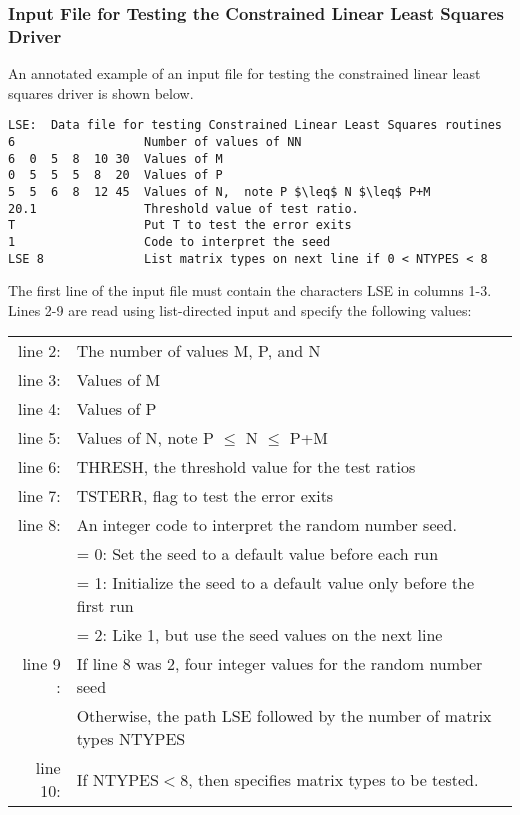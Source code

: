 \subsubsection{Input File for Testing the Constrained Linear Least
Squares Driver}

\dent
An annotated example of an input file for testing the constrained
linear least squares driver is shown below.
\begin{verbatim}
LSE:  Data file for testing Constrained Linear Least Squares routines
6                  Number of values of NN  
6  0  5  8  10 30  Values of M 
0  5  5  5  8  20  Values of P         
5  5  6  8  12 45  Values of N,  note P $\leq$ N $\leq$ P+M
20.1               Threshold value of test ratio.
T                  Put T to test the error exits
1                  Code to interpret the seed
LSE 8              List matrix types on next line if 0 < NTYPES < 8
\end{verbatim}

The first line of the input file must contain the characters LSE
in columns 1-3.  Lines 2-9 are read using list-directed input and
specify the following values:

\begin{tabular}{r l}
\\
line 2: &  The number of values M, P, and N \\
line 3: &  Values of M \\
line 4: &  Values of P \\
line 5: &  Values of N, note P $\leq$ N $\leq$ P+M \\
line 6: &  THRESH, the threshold value for the test ratios \\
line 7: &  TSTERR, flag to test the error exits \\
line 8: &  An integer code to interpret the random number seed. \\
        &  = 0:  Set the seed to a default value before each run \\
        &  = 1:  Initialize the seed to a default value only before the first run \\
        &  = 2:  Like 1, but use the seed values on the next line \\
line 9 :&  If line 8 was 2, four integer values for the random number seed \\
        &  Otherwise, the path LSE followed by the number of matrix types NTYPES \\
line 10: &  If $\mbox{NTYPES} < 8$, then specifies matrix types to be tested.
\end{tabular}
\newpage

